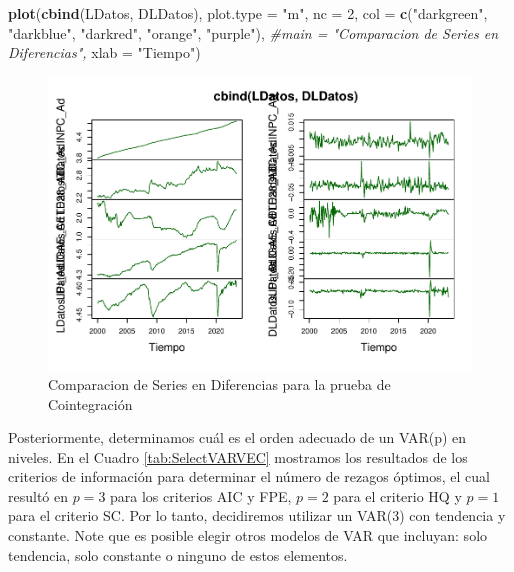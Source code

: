 \documentclass[
]{book}
\newenvironment{Shaded}{\begin{snugshade}}{\end{snugshade}}
\newcommand{\AttributeTok}[1]{\textcolor[rgb]{0.13,0.29,0.53}{#1}}
\newcommand{\CommentTok}[1]{\textcolor[rgb]{0.56,0.35,0.01}{\textit{#1}}}
\newcommand{\DecValTok}[1]{\textcolor[rgb]{0.00,0.00,0.81}{#1}}
\newcommand{\FunctionTok}[1]{\textcolor[rgb]{0.13,0.29,0.53}{\textbf{#1}}}
\newcommand{\NormalTok}[1]{#1}
\newcommand{\StringTok}[1]{\textcolor[rgb]{0.31,0.60,0.02}{#1}}
\begin{document}
\begin{Shaded}
\begin{Highlighting}[]
\FunctionTok{plot}\NormalTok{(}\FunctionTok{cbind}\NormalTok{(LDatos, DLDatos), }
     \AttributeTok{plot.type =} \StringTok{"m"}\NormalTok{, }\AttributeTok{nc =} \DecValTok{2}\NormalTok{,}
     \AttributeTok{col =} \FunctionTok{c}\NormalTok{(}\StringTok{"darkgreen"}\NormalTok{, }\StringTok{"darkblue"}\NormalTok{, }\StringTok{"darkred"}\NormalTok{, }\StringTok{"orange"}\NormalTok{, }\StringTok{"purple"}\NormalTok{), }
     \CommentTok{\#main = "Comparacion de Series en Diferencias", }
     \AttributeTok{xlab =} \StringTok{"Tiempo"}\NormalTok{)}
\end{Highlighting}
\end{Shaded}

\begin{figure}

{\centering \includegraphics{Notas-Series-Tiempo_files/figure-latex/fig83-1} 

}

\caption{Comparacion de Series en Diferencias para la prueba de Cointegración}\label{fig:fig83}
\end{figure}

Posteriormente, determinamos cuál es el orden adecuado de un VAR(p) en niveles. En el Cuadro \ref{tab:SelectVARVEC} mostramos los resultados de los criterios de información para determinar el número de rezagos óptimos, el cual resultó en \(p = 3\) para los criterios AIC y FPE, \(p = 2\) para el criterio HQ y \(p = 1\) para el criterio SC. Por lo tanto, decidiremos utilizar un VAR(3) con tendencia y constante. Note que es posible elegir otros modelos de VAR que incluyan: solo tendencia, solo constante o ninguno de estos elementos.
\end{document}
